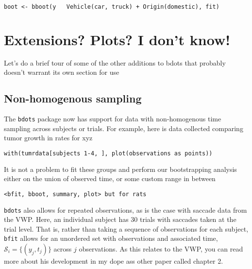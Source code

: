 \documentclass{article}
\begin{document}
\begin{center}
\tt boot <- bboot(y ~ Vehicle(car, truck) + Origin(domestic), fit)
\end{center}






\section{Extensions? Plots? I don't know!}

Let's do a brief tour of some of the other additions to bdots that probably doesn't warrant its own section for use

\subsection{Non-homogenous sampling}

The \texttt{bdots} package now has support for data with non-homogenous time sampling across subjects or trials. For example, here is data collected comparing tumor growth in rates for xyz

\begin{center}
\texttt{with(tumrdata[subjects 1-4, ], plot(observations as points))}
\end{center}

It is not a problem to fit these groups and perform our bootstrapping analysis either on the union of observed time, or some custom range in between

\begin{center}
\texttt{<bfit, bboot, summary, plot> but for rats}
\end{center}

\texttt{bdots} also allows for repeated observations, as is the case with saccade data from the VWP. Here, an individual subject has 30 trials with saccades taken at the trial level. That is, rather than taking a sequence of observations for each subject, \texttt{bfit} allows for an unordered set with observations and associated time, $\mathcal{S}_i = \{(y_j, t_j)\}$ across $j$ observations. As this relates to the VWP, you can read more about his development in my dope ass other paper called chapter 2.
\end{document}
